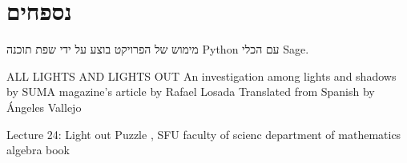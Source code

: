 \documentclass[12pt,leqno]{article}
\begin{document}
\newpage
\section{נספחים}
מימוש של הפרויקט בוצע על ידי 
שפת תוכנה 
{Python}
עם הכלי 
{Sage}.


\newpage
\begin{thebibliography}{99}
\begin{english}
 ALL LIGHTS AND LIGHTS OUT
An investigation among lights and shadows by
SUMA magazine’s article by Rafael Losada
Translated from Spanish by Ángeles Vallejo

 Lecture 24: Light out Puzzle , SFU faculty of scienc department of mathematics
 algebra book %
\end{english}
\end{thebibliography}
\end{document}
